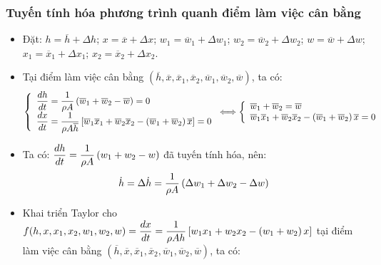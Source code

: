 \subsubsection{Tuyến tính hóa phương trình quanh điểm làm việc cân bằng}
    \begin{itemize}
        \item Đặt: $h = \overline{h} + \Delta h$; $x = \overline{x} + \Delta x$; $w_1 = \overline{w}_1 + \Delta w_1$; $w_2 = \overline{w}_2 + \Delta w_2$; $w = \overline{w} + \Delta w$; $x_1 = \overline{x}_1 + \Delta x_1$; $x_2 = \overline{x}_2 + \Delta x_2$.
        \item Tại điểm làm việc cân bằng $(\overline{h}, \overline{x}, \overline{x}_1, \overline{x}_2, \overline{w}_1, \overline{w}_2, \overline{w})$, ta có:
            \begin{align*}
                \left\{\begin{array}{l}
                    \dfrac{dh}{dt}  = \dfrac{1}{\rho A} \left({\overline{w}_1 + \overline{w}_2 - \overline{w}}\right) = 0 \\
                    \dfrac{dx}{dt}  = \dfrac{1}{\rho A \overline{h}} \left[{\overline{w}_1 \overline{x}_1 + \overline{w}_2 \overline{x}_2 - \left({\overline{w}_1 + \overline{w}_2}\right)\overline{x}}\right] = 0
                \end{array}\right.
                \Longleftrightarrow
                \left\{\begin{array}{l}
                     \overline{w}_1 + \overline{w}_2 = \overline{w} \\
                    \overline{w}_1\overline{x}_1 + \overline{w}_2\overline{x}_2 - \left({\overline{w}_1 + \overline{w}_2}\right)\overline{x} = 0
                \end{array}\right.
            \end{align*}
        \item Ta có: $\dfrac{dh}{dt}  = \dfrac{1}{\rho A} \left({w_1 + w_2 - w}\right)$ đã tuyến tính hóa, nên:
            \begin{align*}
                \dot{h} = \Delta \dot{h} = \dfrac{1}{\rho A} \left({\Delta w_1 + \Delta w_2 - \Delta w}\right)
            \end{align*}
        \item Khai triển Taylor cho $f(h, x, x_1, x_2, w_1, w_2, w) = \dfrac{dx}{dt}  = \dfrac{1}{\rho A h} \left[{w_1x_1 + w_2x_2 - \left({w_1 + w_2}\right)x}\right]$ tại điểm làm việc cân bằng $(\overline{h}, \overline{x}, \overline{x}_1, \overline{x}_2, \overline{w}_1, \overline{w}_2, \overline{w})$, ta có:
            \begin{align*}

\end{align*}
\end{itemize}

